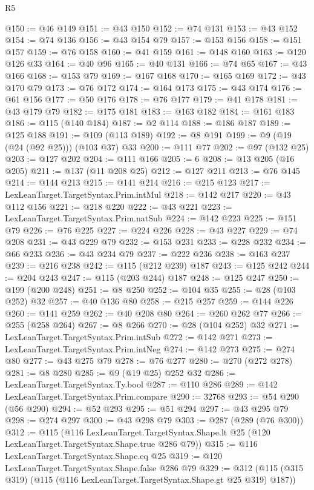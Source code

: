 \begin{lexlean}{R5}
\begin{coremodule}
@150 := @46 @149
@151 := @43 @150
@152 := @74 @131
@153 := @43 @152
@154 := @74 @136
@156 := @43 @154 @79
@157 := @153 @156
@158 := @151 @157
@159 := @76 @158
@160 := @41 @159
@161 := @148 @160
@163 := @120 @126 @33
@164 := @40 @96
@165 := @40 @131
@166 := @74 @65
@167 := @43 @166
@168 := @153 @79
@169 := @167 @168
@170 := @165 @169
@172 := @43 @170 @79
@173 := @76 @172
@174 := @164 @173
@175 := @43 @174
@176 := @61 @156
@177 := @50 @176
@178 := @76 @177
@179 := @41 @178
@181 := @43 @179 @79
@182 := @175 @181
@183 := @163 @182
@184 := @161 @183
@186 := @115 (@140 @184)
@187 := @2 @114
@188 := @186 @187
@189 := @125 @188
@191 := @109 (@113 @189)
@192 := @8 @191
@199 := @9 (@19 (@24 (@92 @25))) (@103 @37) @33
@200 := @111 @77
@202 := @97 (@132 @25)
@203 := @127 @202
@204 := @111 @166
@205 := 6
@208 := @13 @205 (@16 @205)
@211 := @137 (@11 @208 @25)
@212 := @127 @211
@213 := @76 @145
@214 := @144 @213
@215 := @141 @214
@216 := @215 @123
@217 := LexLeanTarget.TargetSyntax.Prim.intMul
@218 := @142 @217
@220 := @43 @112 @156
@221 := @218 @220
@222 := @43 @221
@223 := LexLeanTarget.TargetSyntax.Prim.natSub
@224 := @142 @223
@225 := @151 @79
@226 := @76 @225
@227 := @224 @226
@228 := @43 @227
@229 := @74 @208
@231 := @43 @229 @79
@232 := @153 @231
@233 := @228 @232
@234 := @66 @233
@236 := @43 @234 @79
@237 := @222 @236
@238 := @163 @237
@239 := @216 @238
@242 := @115 (@212 @239) @187
@243 := @125 @242
@244 := @204 @243
@247 := @115 (@203 @244) @187
@248 := @125 @247
@250 := @199 (@200 @248)
@251 := @8 @250
@252 := @104 @35
@255 := @28 (@103 @252) @32
@257 := @40 @136 @80
@258 := @215 @257
@259 := @144 @226
@260 := @141 @259
@262 := @40 @208 @80
@264 := @260 @262 @77
@266 := @255 (@258 @264)
@267 := @8 @266
@270 := @28 (@104 @252) @32
@271 := LexLeanTarget.TargetSyntax.Prim.intSub
@272 := @142 @271
@273 := LexLeanTarget.TargetSyntax.Prim.intNeg
@274 := @142 @273
@275 := @274 @80
@277 := @43 @275 @79
@278 := @76 @277
@280 := @270 (@272 @278)
@281 := @8 @280
@285 := @9 (@19 @25) @252 @32
@286 := LexLeanTarget.TargetSyntax.Ty.bool
@287 := @110 @286
@289 := @142 LexLeanTarget.TargetSyntax.Prim.compare
@290 := 32768
@293 := @54 @290 (@56 @290)
@294 := @52 @293
@295 := @51 @294
@297 := @43 @295 @79
@298 := @274 @297
@300 := @43 @298 @79
@303 := @287 (@289 (@76 @300))
@312 := @115
    (@116
      LexLeanTarget.TargetSyntax.Shape.lt
      @25
      (@120 LexLeanTarget.TargetSyntax.Shape.true @286 @79))
@315 := @116 LexLeanTarget.TargetSyntax.Shape.eq @25
@319 := @120 LexLeanTarget.TargetSyntax.Shape.false @286 @79
@329 := @312 (@115 (@315 @319) (@115 (@116 LexLeanTarget.TargetSyntax.Shape.gt @25 @319) @187))

\end{coremodule}
\end{lexlean}
